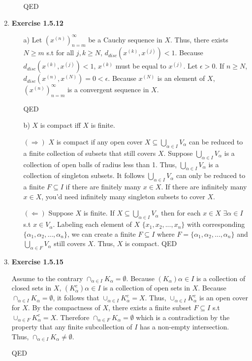 \documentclass[10pt]{article}
\begin{document}
\begin{enumerate}[label=Problem \arabic*.]
\begin{itemize}
        QED        
    \end{itemize}
    \item \textbf{Exercise 1.5.12} \par
    \begin{itemize}
        \item [a)] Let $(x^{(n)})_{n=m}^{\infty}$ be a Cauchy sequence in $X$. 
        Thus, there exists $N\ge m$ s.t for all $j,k\ge N$, $d_{disc}(x^{(k)},x^{(j)})<1$. 
        Because $d_{disc}(x^{(k)},x^{(j)})<1$, $x^{(k)}$ must be equal to $x^{(j)}$. 
        Let $\epsilon>0$. If $n\ge N$, $d_{disc}(x^{(n)},x^{(N)})=0<\epsilon$. 
        Because $x^{(N)}$ is an element of $X$, $(x^{(n)})_{n=m}^{\infty}$ is a convergent sequence in $X$.\par 
        QED
        \item [b)] $X$ is compact iff $X$ is finite. \par 
        $(\Rightarrow)$ $X$ is compact if any open cover $X\subseteq\displaystyle{\bigcup_{\alpha\in I}}V_\alpha$ can be reduced to a finite collection of subsets that still covers $X$.
        Suppose $\displaystyle{\bigcup_{\alpha\in I}}V_\alpha$ is a collection of open balls of radius less than 1. Thus, $\displaystyle{\bigcup_{\alpha\in I}}V_\alpha$ is a collection of singleton subsets.
        It follows $\displaystyle{\bigcup_{\alpha\in I}}V_\alpha$ can only be reduced to a finite $F\subseteq I$ if there are finitely many $x\in X$.
        If there are infinitely many $x\in X$, you'd need infinitely many singleton subsets to cover $X$.\par 
        $(\Leftarrow)$ Suppose $X$ is finite. If $X\subseteq\displaystyle{\bigcup_{\alpha\in I}}V_\alpha$ then for each $x\in X$ $\exists\alpha\in I$ s.t $x\in V_\alpha$.
        Labeling each element of $X$ $\{x_1,x_2,...,x_n\}$ with corresponding $\{\alpha_1,\alpha_2,...,\alpha_n\}$, we can create a finite $F\subseteq I$ where $F=\{\alpha_1,\alpha_2,...,\alpha_n\}$ and $\displaystyle{\bigcup_{\alpha\in F}}V_\alpha$ still covers $X$.
        Thus, $X$ is compact.
        QED\par 
       
    \end{itemize}
    \item \textbf{Exercise 1.5.15} \par
    Assume to the contrary $\displaystyle{\cap_{\alpha\in I}K_{\alpha}}=\emptyset$. 
    Because $(K_\alpha)\alpha\in I$ is a collection of closed sets in $X$, $(K^{c}_{\alpha})\alpha\in I$ is a collection of open sets in $X$. 
    Because $\displaystyle{\cap_{\alpha\in I}K_{\alpha}}=\emptyset$, it follows that $\displaystyle{\cup_{\alpha\in I}K^{c}_{\alpha}}=X$. 
    Thus, $\displaystyle{\cup_{\alpha\in I}K^{c}_{\alpha}}$ is an open cover for $X$. 
    By the compactness of $X$, there exists a finite subset $F\subseteq I$ s.t $\displaystyle{\cup_{\alpha\in F}K^{c}_{\alpha}}=X$.
    Therefore $\displaystyle{\cap_{\alpha\in F}K_{\alpha}}=\emptyset$ which is a contradiction by the property that any finite subcollection of $I$ has a non-empty intersection.
    Thus, $\displaystyle{\cap_{\alpha\in I}K_{\alpha}}\neq\emptyset$.\par 
    QED
    

\end{enumerate}
\end{document}
